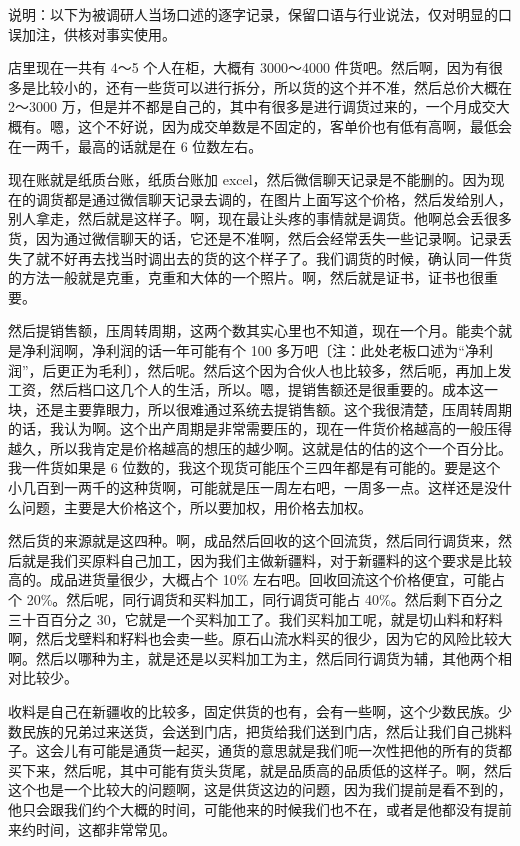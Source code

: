 \documentclass[12pt, a4paper]{ctexart}
\begin{document}
\noindent
{\small 说明：以下为被调研人当场口述的逐字记录，保留口语与行业说法，仅对明显的口误加注，供核对事实使用。}

\medskip
\noindent
店里现在一共有 4～5 个人在柜，大概有 3000～4000 件货吧。然后啊，因为有很多是比较小的，还有一些货可以进行拆分，所以货的这个并不准，然后总价大概在 2～3000 万，但是并不都是自己的，其中有很多是进行调货过来的，一个月成交大概有。嗯，这个不好说，因为成交单数是不固定的，客单价也有低有高啊，最低会在一两千，最高的话就是在 6 位数左右。

\medskip
\noindent
现在账就是纸质台账，纸质台账加 excel，然后微信聊天记录是不能删的。因为现在的调货都是通过微信聊天记录去调的，在图片上面写这个价格，然后发给别人，别人拿走，然后就是这样子。啊，现在最让头疼的事情就是调货。他啊总会丢很多货，因为通过微信聊天的话，它还是不准啊，然后会经常丢失一些记录啊。记录丢失了就不好再去找当时调出去的货的这个样子了。我们调货的时候，确认同一件货的方法一般就是克重，克重和大体的一个照片。啊，然后就是证书，证书也很重要。

\medskip
\noindent
然后提销售额，压周转周期，这两个数其实心里也不知道，现在一个月。能卖个就是净利润啊，净利润的话一年可能有个 100 多万吧〔注：此处老板口述为“净利润”，后更正为毛利〕，然后呢。然后这个因为合伙人也比较多，然后呃，再加上发工资，然后档口这几个人的生活，所以。嗯，提销售额还是很重要的。成本这一块，还是主要靠眼力，所以很难通过系统去提销售额。这个我很清楚，压周转周期的话，我认为啊。这个出产周期是非常需要压的，现在一件货价格越高的一般压得越久，所以我肯定是价格越高的想压的越少啊。这就是估的估的这个一个百分比。我一件货如果是 6 位数的，我这个现货可能压个三四年都是有可能的。要是这个小几百到一两千的这种货啊，可能就是压一周左右吧，一周多一点。这样还是没什么问题，主要是大价格这个，所以要加权，用价格去加权。

\medskip
\noindent
然后货的来源就是这四种。啊，成品然后回收的这个回流货，然后同行调货来，然后就是我们买原料自己加工，因为我们主做新疆料，对于新疆料的这个要求是比较高的。成品进货量很少，大概占个 10\% 左右吧。回收回流这个价格便宜，可能占个 20\%。然后呢，同行调货和买料加工，同行调货可能占 40\%。然后剩下百分之三十百百分之 30，它就是一个买料加工了。我们买料加工呢，就是切山料和籽料啊，然后戈壁料和籽料也会卖一些。原石山流水料买的很少，因为它的风险比较大啊。然后以哪种为主，就是还是以买料加工为主，然后同行调货为辅，其他两个相对比较少。

\medskip
\noindent
收料是自己在新疆收的比较多，固定供货的也有，会有一些啊，这个少数民族。少数民族的兄弟过来送货，会送到门店，把货给我们送到门店，然后让我们自己挑料子。这会儿有可能是通货一起买，通货的意思就是我们呃一次性把他的所有的货都买下来，然后呢，其中可能有货头货尾，就是品质高的品质低的这样子。啊，然后这个也是一个比较大的问题啊，这是供货这边的问题，因为我们提前是看不到的，他只会跟我们约个大概的时间，可能他来的时候我们也不在，或者是他都没有提前来约时间，这都非常常见。
\end{document}
